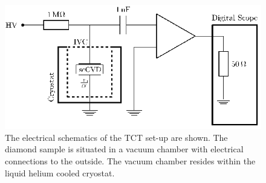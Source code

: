 \begin{figure}[t]
  \includegraphics[width=0.45\linewidth]{./figures/circuit2}

   \caption{The electrical schematics of the TCT set-up are shown. 
   The diamond sample is situated in a vacuum chamber with electrical connections to the outside. 
   The vacuum chamber resides within the liquid helium cooled  cryostat.}
   \label{fig:SETUPtct2}
\end{figure}


